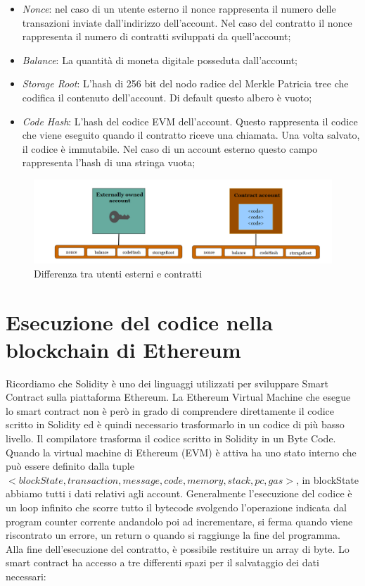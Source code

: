 \documentclass[12pt]{report}
\begin{document}
\begin{itemize}
\item \textit{Nonce}: nel caso di un utente esterno il nonce rappresenta il numero delle transazioni inviate dall'indirizzo dell'account. Nel caso del contratto il nonce rappresenta il numero di contratti sviluppati da quell'account;
\item \textit{Balance}: La quantità di moneta digitale posseduta dall'account;
\item \textit{Storage Root}: L'hash di 256 bit del nodo radice del Merkle Patricia tree \cite{MerklePatriciaTree} che codifica il contenuto dell'account. Di default questo albero è vuoto;
\item \textit{Code Hash}: L'hash del codice EVM \cite{EthereumHomestead} dell'account. Questo rappresenta il codice che viene eseguito quando il contratto riceve una chiamata. Una volta salvato, il codice è immutabile. Nel caso di un account esterno questo campo rappresenta l'hash di una stringa vuota;
\end{itemize}

\begin{figure}[H]
    \includegraphics[width=\textwidth]{utentiContratti}
    \caption{Differenza tra utenti esterni e contratti}
\end{figure}

\section{Esecuzione del codice nella blockchain di Ethereum}

Ricordiamo che Solidity è uno dei linguaggi utilizzati per sviluppare Smart Contract sulla piattaforma Ethereum. 
La Ethereum Virtual Machine che esegue lo smart contract non è però in grado di comprendere direttamente il codice scritto in Solidity ed è quindi necessario trasformarlo in un codice di più basso livello.
Il compilatore trasforma il codice scritto in Solidity in un Byte Code.
Quando la virtual machine di Ethereum (EVM) è attiva ha uno stato interno che può essere definito dalla tuple $<blockState, transaction, message, code, memory, stack, pc, gas>$, in blockState abbiamo tutti i dati relativi agli account.
\newline Generalmente l'esecuzione del codice è un loop infinito che scorre tutto il bytecode svolgendo l'operazione indicata dal program counter corrente andandolo poi ad incrementare, si ferma quando viene riscontrato un errore, un return o quando si raggiunge la fine del programma.
Alla fine dell'esecuzione del contratto, è possibile restituire un array di byte.
Lo smart contract ha accesso a tre differenti spazi per il salvataggio dei dati necessari:
\end{document}
